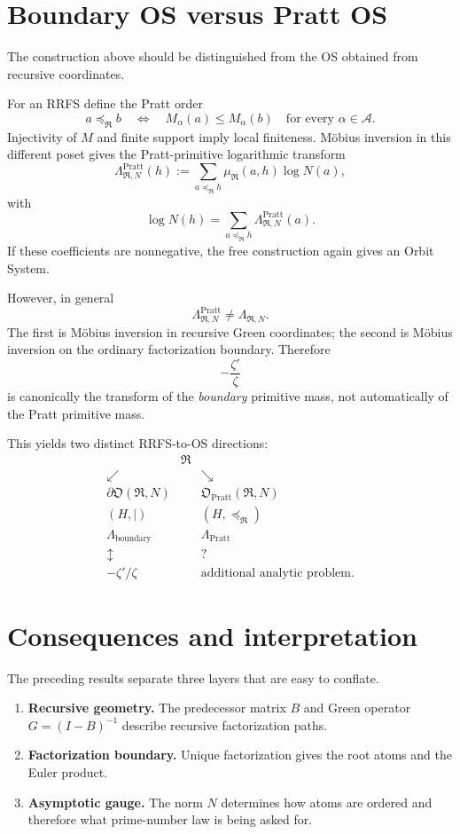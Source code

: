 \documentclass[11pt]{article}
\newcommand{\cA}{\mathcal A}
\newcommand{\cR}{\mathfrak R}
\newcommand{\cO}{\mathfrak O}
\begin{document}
\section{Boundary OS versus Pratt OS}

The construction above should be distinguished from the OS obtained from recursive coordinates.

For an RRFS define the Pratt order
\[
a\preceq_{\cR}b
\quad\Longleftrightarrow\quad
M_\alpha(a)\le M_\alpha(b)
\quad\text{for every }\alpha\in\cA.
\]
Injectivity of $M$ and finite support imply local finiteness. M\"obius inversion in this different poset gives the Pratt-primitive logarithmic transform
\begin{equation}\label{eq:prattlambda}
\Lambda^{\mathrm{Pratt}}_{\cR,N}(h)
:=\sum_{a\preceq_{\cR}h}
\mu_{\cR}(a,h)\log N(a),
\end{equation}
with
\[
\log N(h)=\sum_{a\preceq_{\cR}h}
\Lambda^{\mathrm{Pratt}}_{\cR,N}(a).
\]
If these coefficients are nonnegative, the free construction again gives an Orbit System.

However, in general
\[
\boxed{
\Lambda^{\mathrm{Pratt}}_{\cR,N}
\ne
\Lambda_{\cR,N}.}
\]
The first is M\"obius inversion in recursive Green coordinates; the second is M\"obius inversion on the ordinary factorization boundary. Therefore
\[
-\frac{\zeta'}{\zeta}
\]
is canonically the transform of the \emph{boundary} primitive mass, not automatically of the Pratt primitive mass.

This yields two distinct RRFS-to-OS directions:
\[
\boxed{
\begin{array}{ccc}
&\cR&\\[1mm]
\swarrow&&\searrow\\[-1mm]
\partial\cO(\cR,N)&&\cO_{\mathrm{Pratt}}(\cR,N)\\
(H,\mid)&&(H,\preceq_{\cR})\\
\Lambda_{\mathrm{boundary}}&&\Lambda_{\mathrm{Pratt}}\\
\updownarrow&&?\\
-\zeta'/\zeta&&\text{additional analytic problem.}
\end{array}}
\]

\section{Consequences and interpretation}

The preceding results separate three layers that are easy to conflate.

\begin{enumerate}[label=\arabic*.]
\item \textbf{Recursive geometry.} The predecessor matrix $B$ and Green operator $G=(I-B)^{-1}$ describe recursive factorization paths.
\item \textbf{Factorization boundary.} Unique factorization gives the root atoms and the Euler product.
\item \textbf{Asymptotic gauge.} The norm $N$ determines how atoms are ordered and therefore what prime-number law is being asked for.
\end{enumerate}
\end{document}
